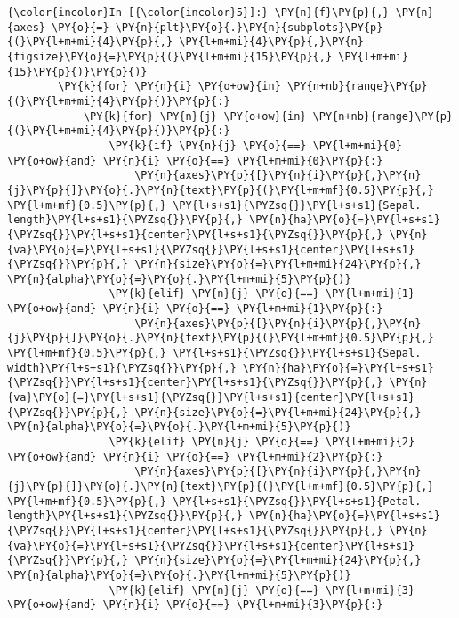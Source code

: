     \begin{Verbatim}[commandchars=\\\{\}]
{\color{incolor}In [{\color{incolor}5}]:} \PY{n}{f}\PY{p}{,} \PY{n}{axes} \PY{o}{=} \PY{n}{plt}\PY{o}{.}\PY{n}{subplots}\PY{p}{(}\PY{l+m+mi}{4}\PY{p}{,} \PY{l+m+mi}{4}\PY{p}{,}\PY{n}{figsize}\PY{o}{=}\PY{p}{(}\PY{l+m+mi}{15}\PY{p}{,} \PY{l+m+mi}{15}\PY{p}{)}\PY{p}{)}
        \PY{k}{for} \PY{n}{i} \PY{o+ow}{in} \PY{n+nb}{range}\PY{p}{(}\PY{l+m+mi}{4}\PY{p}{)}\PY{p}{:}
            \PY{k}{for} \PY{n}{j} \PY{o+ow}{in} \PY{n+nb}{range}\PY{p}{(}\PY{l+m+mi}{4}\PY{p}{)}\PY{p}{:}
                \PY{k}{if} \PY{n}{j} \PY{o}{==} \PY{l+m+mi}{0} \PY{o+ow}{and} \PY{n}{i} \PY{o}{==} \PY{l+m+mi}{0}\PY{p}{:}
                    \PY{n}{axes}\PY{p}{[}\PY{n}{i}\PY{p}{,}\PY{n}{j}\PY{p}{]}\PY{o}{.}\PY{n}{text}\PY{p}{(}\PY{l+m+mf}{0.5}\PY{p}{,} \PY{l+m+mf}{0.5}\PY{p}{,} \PY{l+s+s1}{\PYZsq{}}\PY{l+s+s1}{Sepal. length}\PY{l+s+s1}{\PYZsq{}}\PY{p}{,} \PY{n}{ha}\PY{o}{=}\PY{l+s+s1}{\PYZsq{}}\PY{l+s+s1}{center}\PY{l+s+s1}{\PYZsq{}}\PY{p}{,} \PY{n}{va}\PY{o}{=}\PY{l+s+s1}{\PYZsq{}}\PY{l+s+s1}{center}\PY{l+s+s1}{\PYZsq{}}\PY{p}{,} \PY{n}{size}\PY{o}{=}\PY{l+m+mi}{24}\PY{p}{,} \PY{n}{alpha}\PY{o}{=}\PY{o}{.}\PY{l+m+mi}{5}\PY{p}{)}
                \PY{k}{elif} \PY{n}{j} \PY{o}{==} \PY{l+m+mi}{1} \PY{o+ow}{and} \PY{n}{i} \PY{o}{==} \PY{l+m+mi}{1}\PY{p}{:}
                    \PY{n}{axes}\PY{p}{[}\PY{n}{i}\PY{p}{,}\PY{n}{j}\PY{p}{]}\PY{o}{.}\PY{n}{text}\PY{p}{(}\PY{l+m+mf}{0.5}\PY{p}{,} \PY{l+m+mf}{0.5}\PY{p}{,} \PY{l+s+s1}{\PYZsq{}}\PY{l+s+s1}{Sepal. width}\PY{l+s+s1}{\PYZsq{}}\PY{p}{,} \PY{n}{ha}\PY{o}{=}\PY{l+s+s1}{\PYZsq{}}\PY{l+s+s1}{center}\PY{l+s+s1}{\PYZsq{}}\PY{p}{,} \PY{n}{va}\PY{o}{=}\PY{l+s+s1}{\PYZsq{}}\PY{l+s+s1}{center}\PY{l+s+s1}{\PYZsq{}}\PY{p}{,} \PY{n}{size}\PY{o}{=}\PY{l+m+mi}{24}\PY{p}{,} \PY{n}{alpha}\PY{o}{=}\PY{o}{.}\PY{l+m+mi}{5}\PY{p}{)}
                \PY{k}{elif} \PY{n}{j} \PY{o}{==} \PY{l+m+mi}{2} \PY{o+ow}{and} \PY{n}{i} \PY{o}{==} \PY{l+m+mi}{2}\PY{p}{:}
                    \PY{n}{axes}\PY{p}{[}\PY{n}{i}\PY{p}{,}\PY{n}{j}\PY{p}{]}\PY{o}{.}\PY{n}{text}\PY{p}{(}\PY{l+m+mf}{0.5}\PY{p}{,} \PY{l+m+mf}{0.5}\PY{p}{,} \PY{l+s+s1}{\PYZsq{}}\PY{l+s+s1}{Petal. length}\PY{l+s+s1}{\PYZsq{}}\PY{p}{,} \PY{n}{ha}\PY{o}{=}\PY{l+s+s1}{\PYZsq{}}\PY{l+s+s1}{center}\PY{l+s+s1}{\PYZsq{}}\PY{p}{,} \PY{n}{va}\PY{o}{=}\PY{l+s+s1}{\PYZsq{}}\PY{l+s+s1}{center}\PY{l+s+s1}{\PYZsq{}}\PY{p}{,} \PY{n}{size}\PY{o}{=}\PY{l+m+mi}{24}\PY{p}{,} \PY{n}{alpha}\PY{o}{=}\PY{o}{.}\PY{l+m+mi}{5}\PY{p}{)}
                \PY{k}{elif} \PY{n}{j} \PY{o}{==} \PY{l+m+mi}{3} \PY{o+ow}{and} \PY{n}{i} \PY{o}{==} \PY{l+m+mi}{3}\PY{p}{:}

\end{Verbatim}

